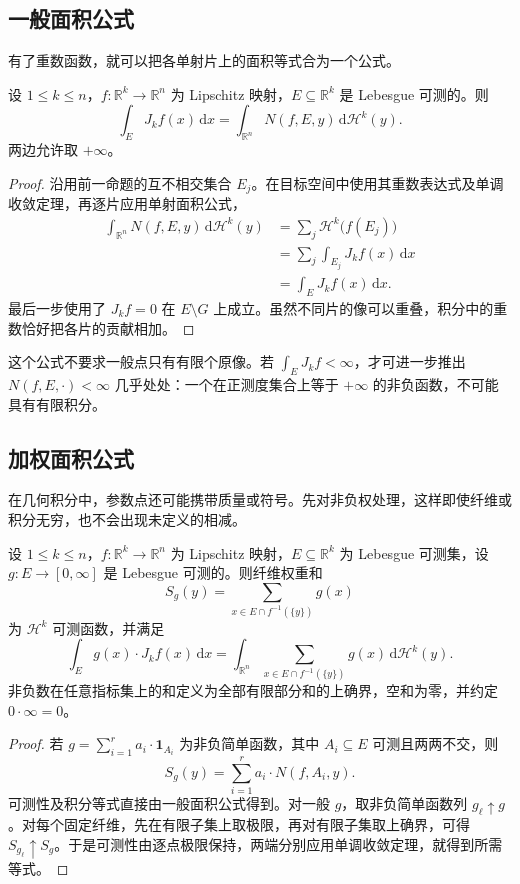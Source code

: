 \subsection{一般面积公式}
\label{b1:subsec:170303}

有了重数函数，就可以把各单射片上的面积等式合为一个公式。

\begin{theorem}[面积公式]\label{b1:thm:area-formula}
设 \(1\leq k\leq n\)，\(f:\mathbb R^k\rightarrow\mathbb R^n\) 为 Lipschitz 映射，\(E\subseteq\mathbb R^k\) 是 Lebesgue 可测的。则
\[
 \int_EJ_kf(x)\,\mathrm dx
 =
 \int_{\mathbb R^n}N(f,E,y)\,\mathrm d\mathcal H^k(y).
\]
两边允许取 \(+\infty\)。
\end{theorem}
\begin{proof}
沿用前一命题的互不相交集合 \(E_j\)。在目标空间中使用其重数表达式及单调收敛定理，再逐片应用单射面积公式，
\[
 \begin{aligned}
 \int_{\mathbb R^n}N(f,E,y)\,\mathrm d\mathcal H^k(y)
 &=\sum_j\mathcal H^k\bigl(f(E_j)\bigr)\\
 &=\sum_j\int_{E_j}J_kf(x)\,\mathrm dx\\
 &=\int_EJ_kf(x)\,\mathrm dx.
 \end{aligned}
\]
最后一步使用了 \(J_kf=0\) 在 \(E\setminus G\) 上成立。虽然不同片的像可以重叠，积分中的重数恰好把各片的贡献相加。
\end{proof}

这个公式不要求一般点只有有限个原像。若 \(\int_EJ_kf<\infty\)，才可进一步推出 \(N(f,E,\cdot)<\infty\) 几乎处处：一个在正测度集合上等于 \(+\infty\) 的非负函数，不可能具有有限积分。

\subsection{加权面积公式}
\label{b1:subsec:170304}

在几何积分中，参数点还可能携带质量或符号。先对非负权处理，这样即使纤维或积分无穷，也不会出现未定义的相减。

\begin{theorem}[加权面积公式]\label{b1:thm:weighted-area-formula}
设 \(1\le k\le n\)，\(f:\mathbb R^k\to\mathbb R^n\) 为 Lipschitz 映射，\(E\subseteq\mathbb R^k\) 为 Lebesgue 可测集，设 \(g:E\rightarrow[0,\infty]\) 是 Lebesgue 可测的。则纤维权重和
\[
 S_g(y)=\sum_{x\in E\cap f^{-1}(\{y\})}g(x)
\]
为 \(\mathcal H^k\) 可测函数，并满足
\[
 \int_E g(x)\cdot J_kf(x)\,\mathrm dx
 =
 \int_{\mathbb R^n}
       \sum_{x\in E\cap f^{-1}(\{y\})}g(x)\,
       \mathrm d\mathcal H^k(y).
\]
非负数在任意指标集上的和定义为全部有限部分和的上确界，空和为零，并约定 \(0\cdot\infty=0\)。
\end{theorem}
\begin{proof}
若 \(g=\sum_{i=1}^ra_i\cdot\mathbf1_{A_i}\) 为非负简单函数，其中 \(A_i\subseteq E\) 可测且两两不交，则
\[
 S_g(y)=\sum_{i=1}^r a_i\cdot N(f,A_i,y).
\]
可测性及积分等式直接由一般面积公式得到。对一般 \(g\)，取非负简单函数列 \(g_\ell\uparrow g\)。对每个固定纤维，先在有限子集上取极限，再对有限子集取上确界，可得 \(S_{g_\ell}\uparrow S_g\)。于是可测性由逐点极限保持，两端分别应用单调收敛定理，就得到所需等式。
\end{proof}

